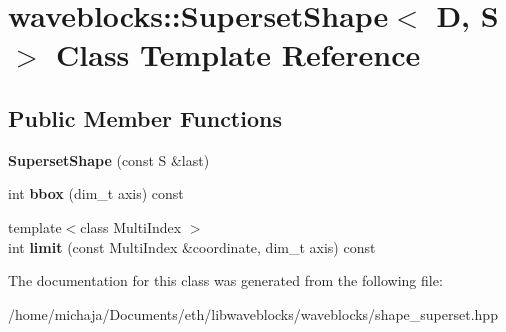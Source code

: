 \hypertarget{classwaveblocks_1_1_superset_shape_3_01_d_00_01_s_01_4}{}\section{waveblocks\+:\+:Superset\+Shape$<$ D, S $>$ Class Template Reference}
\label{classwaveblocks_1_1_superset_shape_3_01_d_00_01_s_01_4}
\subsection*{Public Member Functions}
\begin{DoxyCompactItemize}
\item 
\hypertarget{classwaveblocks_1_1_superset_shape_3_01_d_00_01_s_01_4_a6f03b1df80f5b2f23898fd532e4b3c4c}{}{\bfseries Superset\+Shape} (const S \&last)\label{classwaveblocks_1_1_superset_shape_3_01_d_00_01_s_01_4_a6f03b1df80f5b2f23898fd532e4b3c4c}

\item 
\hypertarget{classwaveblocks_1_1_superset_shape_3_01_d_00_01_s_01_4_ad0eef9808b807812df894dbf012e4627}{}int {\bfseries bbox} (dim\+\_\+t axis) const \label{classwaveblocks_1_1_superset_shape_3_01_d_00_01_s_01_4_ad0eef9808b807812df894dbf012e4627}

\item 
\hypertarget{classwaveblocks_1_1_superset_shape_3_01_d_00_01_s_01_4_a1e0b5aebc4fbd6eb3fa65eecb80bfe25}{}{\footnotesize template$<$class Multi\+Index $>$ }\\int {\bfseries limit} (const Multi\+Index \&coordinate, dim\+\_\+t axis) const \label{classwaveblocks_1_1_superset_shape_3_01_d_00_01_s_01_4_a1e0b5aebc4fbd6eb3fa65eecb80bfe25}

\end{DoxyCompactItemize}


The documentation for this class was generated from the following file\+:\begin{DoxyCompactItemize}
\item 
/home/michaja/\+Documents/eth/libwaveblocks/waveblocks/shape\+\_\+superset.\+hpp\end{DoxyCompactItemize}
